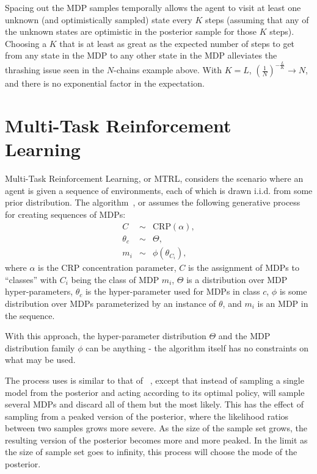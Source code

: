 Spacing out the MDP samples temporally allows the agent to visit at least one unknown (and optimistically sampled) state every $K$ steps (assuming that any of the unknown states are optimistic in the posterior sample for those $K$ steps). Choosing a $K$ that is at least as great as the expected number of steps to get from any state in the MDP to any other state in the MDP alleviates the thrashing issue seen in the $N$-chains example above. With $K=L$, $(\frac 1 N)^{-\frac L K} \rightarrow N$, and there is no exponential factor in the expectation.


\section{Multi-Task Reinforcement Learning}

Multi-Task Reinforcement Learning, or MTRL, considers the scenario where an agent is given a sequence of environments, each of which is drawn i.i.d. from some prior distribution. The  algorithm~\cite{wilson07}, or  assumes the following generative process for creating sequences of MDPs:
\begin{eqnarray}
\label{sec:rel:hbmtrl}
C &\sim& \mbox{CRP}(\alpha),\\
\theta_c &\sim& \Theta,\\
m_i &\sim& \phi(\theta_{C_i}),
\end{eqnarray}
where $\alpha$ is the CRP concentration parameter, $C$ is the assignment of MDPs to ``classes'' with $C_i$ being the class of MDP $m_i$, $\Theta$ is a distribution over MDP hyper-parameters, $\theta_c$ is the hyper-parameter used for MDPs in class $c$, $\phi$ is some distribution over MDPs parameterized by an instance of $\theta$, and $m_i$ is an MDP in the sequence.

With this approach, the hyper-parameter distribution $\Theta$ and the MDP distribution family $\phi$ can be anything - the algorithm itself has no constraints on what may be used.

The process  uses is similar to that of ~\cite{strens00}, except that instead of sampling a single model from the posterior and acting according to its optimal policy,  will sample several MDPs and discard all of them but the most likely. This has the effect of sampling from a peaked version of the posterior, where the likelihood ratios between two samples grows more severe. As the size of the sample set grows, the resulting version of the posterior becomes more and more peaked. In the limit as the size of sample set goes to infinity, this process will choose the mode of the posterior.

